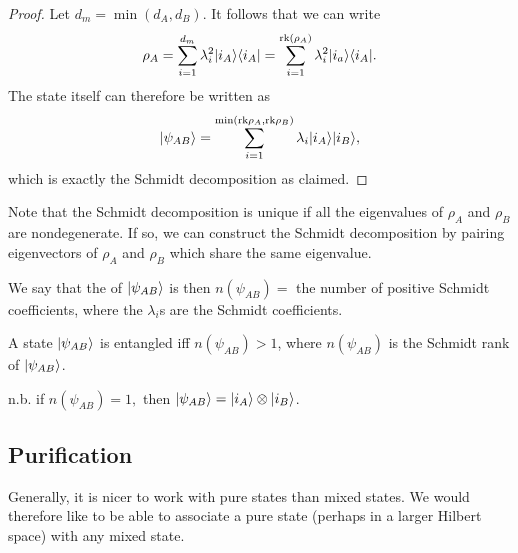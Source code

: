 \begin{proof}
    Let $d_m=\min(d_A,d_B)$. It follows that we can write
    \begin{equation}
        \rho_A = \sum_{i=1}^{d_m} \lambda_i^2 \lvert i_A\rangle\langle i_A\rvert = \sum_{i=1}^{\text{rk}(\rho_A)}\lambda_i^2 \lvert i_a\rangle\langle i_A\rvert.
    \end{equation}
    The state itself can therefore be written as
    \begin{equation}
        \lvert\psi_{AB}\rangle=\sum_{i=1}^{\min(\text{rk}\rho_A,\text{rk}\rho_B)} \lambda_i \lvert i_A\rangle \lvert i_B\rangle,
    \end{equation}
    which is exactly the Schmidt decomposition as claimed.
\end{proof}

Note that the Schmidt decomposition is unique if all the eigenvalues of $\rho_A$ and $\rho_B$ are nondegenerate. If so, we can construct the Schmidt decomposition by pairing eigenvectors of $\rho_A$ and $\rho_B$ which share the same eigenvalue.

\begin{defn}
    We say that the  of $\lvert\psi_{AB}\rangle$ is then $n(\psi_{AB})={}$ the number of positive Schmidt coefficients, where the $\lambda_i$s are the Schmidt coefficients.
\end{defn}

\begin{thm}
    A state $\lvert\psi_{AB}\rangle$ is entangled iff $n(\psi_{AB}) >1$, where $n(\psi_{AB})$ is the Schmidt rank of $\lvert\psi_{AB}\rangle$.
\end{thm}
n.b. if $n(\psi_{AB})=1,$ then $\lvert\psi_{AB}\rangle=\lvert i_A\rangle\otimes \lvert i_B\rangle$.

\subsection*{Purification} Generally, it is nicer to work with pure states than mixed states. We would therefore like to be able to associate a pure state (perhaps in a larger Hilbert space) with any mixed state.

